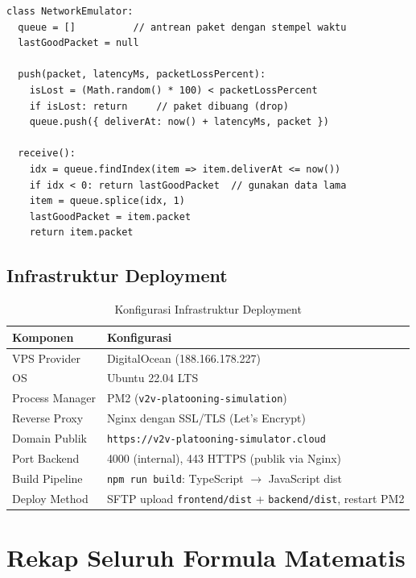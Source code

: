 \documentclass[12pt,a4paper]{article}
\begin{document}
\begin{lstlisting}[style=codeStyle, caption=Emulator Jaringan 5G (networkEmulator.ts)]
class NetworkEmulator:
  queue = []          // antrean paket dengan stempel waktu
  lastGoodPacket = null

  push(packet, latencyMs, packetLossPercent):
    isLost = (Math.random() * 100) < packetLossPercent
    if isLost: return     // paket dibuang (drop)
    queue.push({ deliverAt: now() + latencyMs, packet })

  receive():
    idx = queue.findIndex(item => item.deliverAt <= now())
    if idx < 0: return lastGoodPacket  // gunakan data lama
    item = queue.splice(idx, 1)
    lastGoodPacket = item.packet
    return item.packet
\end{lstlisting}

\subsection{Infrastruktur Deployment}

\begin{table}[ht]
\centering
\caption{Konfigurasi Infrastruktur Deployment}
\begin{tabularx}{\linewidth}{lX}
\toprule
\textbf{Komponen} & \textbf{Konfigurasi} \\
\midrule
VPS Provider & DigitalOcean (188.166.178.227) \\
OS & Ubuntu 22.04 LTS \\
Process Manager & PM2 (\texttt{v2v-platooning-simulation}) \\
Reverse Proxy & Nginx dengan SSL/TLS (Let's Encrypt) \\
Domain Publik & \texttt{https://v2v-platooning-simulator.cloud} \\
Port Backend & 4000 (internal), 443 HTTPS (publik via Nginx) \\
Build Pipeline & \texttt{npm run build}: TypeScript $\to$ JavaScript dist \\
Deploy Method & SFTP upload \texttt{frontend/dist} + \texttt{backend/dist}, restart PM2 \\
\bottomrule
\end{tabularx}
\end{table}

\section{Rekap Seluruh Formula Matematis}
\end{document}
